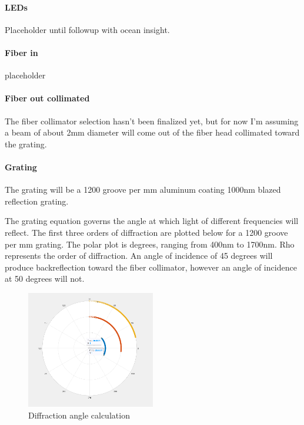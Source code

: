 \paragraph{LEDs}

Placeholder until followup with ocean insight.

\paragraph{Fiber in}

placeholder

\paragraph{Fiber out collimated}

The fiber collimator selection hasn’t been finalized yet, but for now I’m assuming a beam of about 2mm diameter will come out of the fiber head collimated toward the grating.

\paragraph{Grating}

    The grating will be a 1200 groove per mm aluminum coating 1000nm blazed reflection grating. 
 
The grating equation governs the angle at which light of different frequencies will reflect. 
The first three orders of diffraction are plotted below for a 1200 groove per mm grating. The polar plot is degrees, ranging from 400nm to 1700nm. Rho represents the order of diffraction.
An angle of incidence of 45 degrees will produce backreflection toward the fiber collimator, however an angle of incidence at 50 degrees will not.



\begin{figure}[H]
    \caption{Diffraction angle calculation}
    \centering
    \includegraphics[width=0.5\textwidth]{images/DiffractionAngleCalculator.png}
\end{figure}

